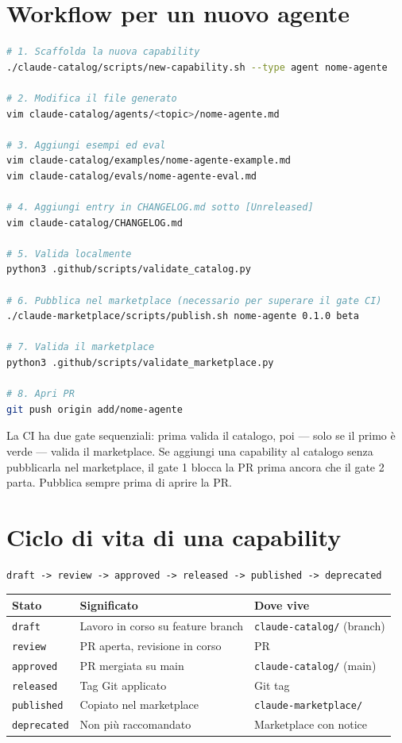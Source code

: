 \documentclass[12pt,a4paper,twoside]{book}
\begin{document}
\section{Workflow per un nuovo agente}

\begin{lstlisting}[language=bash]
# 1. Scaffolda la nuova capability
./claude-catalog/scripts/new-capability.sh --type agent nome-agente

# 2. Modifica il file generato
vim claude-catalog/agents/<topic>/nome-agente.md

# 3. Aggiungi esempi ed eval
vim claude-catalog/examples/nome-agente-example.md
vim claude-catalog/evals/nome-agente-eval.md

# 4. Aggiungi entry in CHANGELOG.md sotto [Unreleased]
vim claude-catalog/CHANGELOG.md

# 5. Valida localmente
python3 .github/scripts/validate_catalog.py

# 6. Pubblica nel marketplace (necessario per superare il gate CI)
./claude-marketplace/scripts/publish.sh nome-agente 0.1.0 beta

# 7. Valida il marketplace
python3 .github/scripts/validate_marketplace.py

# 8. Apri PR
git push origin add/nome-agente
\end{lstlisting}

\begin{attenzione}
La CI ha due gate sequenziali: prima valida il catalogo, poi — solo se il primo è verde — valida il marketplace. Se aggiungi una capability al catalogo senza pubblicarla nel marketplace, il gate 1 blocca la PR prima ancora che il gate 2 parta. Pubblica sempre prima di aprire la PR.
\end{attenzione}

\section{Ciclo di vita di una capability}

\begin{lstlisting}
draft -> review -> approved -> released -> published -> deprecated
\end{lstlisting}

\begin{center}
\begin{tabular}{lll}
\toprule
\textbf{Stato} & \textbf{Significato} & \textbf{Dove vive} \\
\midrule
\texttt{draft} & Lavoro in corso su feature branch & \texttt{claude-catalog/} (branch) \\
\texttt{review} & PR aperta, revisione in corso & PR \\
\texttt{approved} & PR mergiata su main & \texttt{claude-catalog/} (main) \\
\texttt{released} & Tag Git applicato & Git tag \\
\texttt{published} & Copiato nel marketplace & \texttt{claude-marketplace/} \\
\texttt{deprecated} & Non più raccomandato & Marketplace con notice \\
\bottomrule
\end{tabular}
\end{center}
\end{document}
